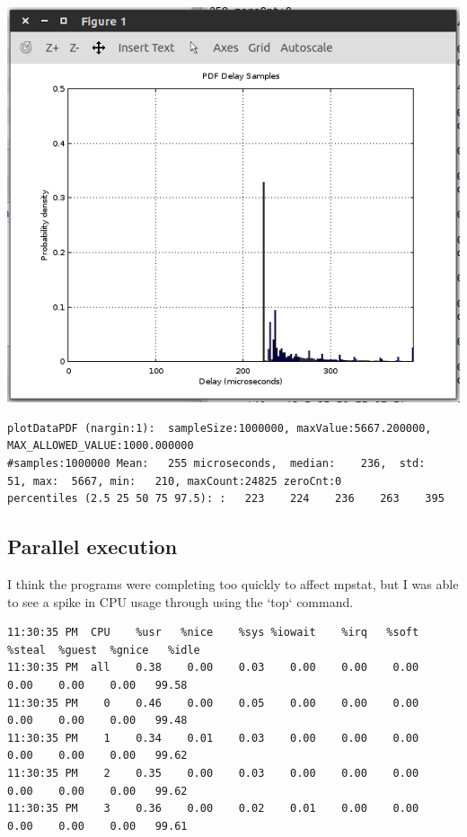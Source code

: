 \documentclass{article}
\begin{document}
\includegraphics{q2/hw1-1000000}

\begin{lstlisting}
plotDataPDF (nargin:1):  sampleSize:1000000, maxValue:5667.200000,  MAX_ALLOWED_VALUE:1000.000000
#samples:1000000 Mean:   255 microseconds,  median:    236,  std:     51, max:  5667, min:   210, maxCount:24825 zeroCnt:0
percentiles (2.5 25 50 75 97.5): :   223    224    236    263    395
\end{lstlisting}

\subsection{Parallel execution}

I think the programs were completing too quickly to affect mpstat, but I was able to see a spike in CPU usage through using the `top` command.

\begin{lstlisting}
11:30:35 PM  CPU    %usr   %nice    %sys %iowait    %irq   %soft  %steal  %guest  %gnice   %idle
11:30:35 PM  all    0.38    0.00    0.03    0.00    0.00    0.00    0.00    0.00    0.00   99.58
11:30:35 PM    0    0.46    0.00    0.05    0.00    0.00    0.00    0.00    0.00    0.00   99.48
11:30:35 PM    1    0.34    0.01    0.03    0.00    0.00    0.00    0.00    0.00    0.00   99.62
11:30:35 PM    2    0.35    0.00    0.03    0.00    0.00    0.00    0.00    0.00    0.00   99.62
11:30:35 PM    3    0.36    0.00    0.02    0.01    0.00    0.00    0.00    0.00    0.00   99.61
\end{lstlisting}
\end{document}
